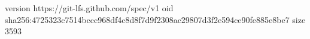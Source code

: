 version https://git-lfs.github.com/spec/v1
oid sha256:4725323c7514bccc968df4c8d8f7d9f2308ac29807d3f2e594ce90fe885e8be7
size 3593
